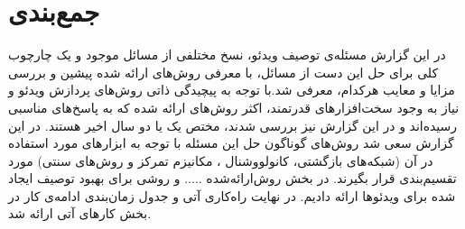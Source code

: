 \section{جمع‌بندی}\label{conclusion}
در این گزارش مسئله‌ی توصیف ویدئو، نسخ مختلفی از مسائل موجود و یک چارچوب کلی برای حل این دست از مسائل، با معرفی روش‌های ارائه شده پیشین و بررسی مزایا و معایب هر‌کدام، معرفی شد.با توجه به پیچیدگی ذاتی روش‌های پردازش ویدئو و نیاز به وجود سخت‌افزار‌های قدرتمند، اکثر روش‌های ارائه شده که به پاسخ‌های مناسبی رسیده‌اند و در این گزارش نیز بررسی شدند، مختص یک یا دو سال اخیر هستند. در این گزارش سعی شد روش‌های گوناگون حل این مسئله با توجه به ابزار‌های مورد استفاده در آن (شبکه‌های بازگشتی، کانولووشنال ، مکانیزم تمرکز و روش‌های سنتی) مورد تقسیم‌بندی قرار بگیرند. در بخش روش‌ارائه‌شده ..... و روشی برای بهبود توصیف ایجاد شده برای ویدئو‌ها ارائه دادیم. در نهایت راه‌کاری آتی و جدول زمان‌بندی ادامه‌ی کار در بخش کار‌های آتی ارائه شد.
